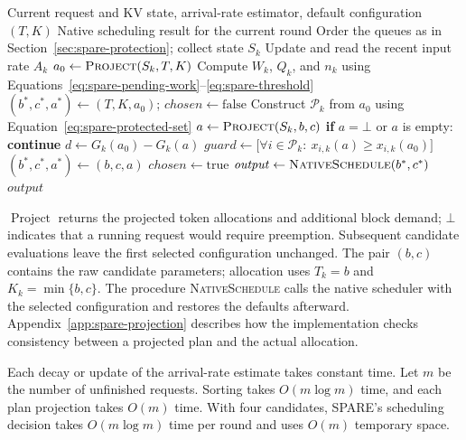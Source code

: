 \documentclass[sigconf,anonymous,review]{acmart}
\begin{document}
\begin{algorithm}[tbp]
\caption{SPARE Per-Iteration Scheduling}
\label{alg:spare-scheduling}
\begingroup
{}
\small
\begin{algorithmic}[1]
\Require Current request and KV state, arrival-rate estimator, default configuration $(T,K)$
\Ensure Native scheduling result for the current round
\State Order the queues as in Section~\ref{sec:spare-protection}; collect state $S_k$
\State Update and read the recent input rate $A_k$
\State $a_0\gets\Call{Project}{S_k,T,K}$
\State Compute $W_k$, $Q_k$, and $n_k$ using Equations~\eqref{eq:spare-pending-work}--\eqref{eq:spare-threshold}
\State $(b^*,c^*,a^*)\gets(T,K,a_0)$; $\mathit{chosen}\gets\mathrm{false}$
    \State Construct $\mathcal P_k$ from $a_0$ using Equation~\eqref{eq:spare-protected-set}
        \State $a\gets\Call{Project}{S_k,b,c}$
        \State \textbf{if} $a=\bot$ or $a$ is empty: \textbf{continue}
        \State $d\gets G_k(a_0)-G_k(a)$
        \State $\mathit{guard}\gets\bigl[\forall i\in\mathcal P_k:\ x_{i,k}(a)\ge x_{i,k}(a_0)\bigr]$
            \State $(b^*,c^*,a^*)\gets(b,c,a)$
            \State $\mathit{chosen}\gets\mathrm{true}$
        \EndIf
    \EndFor
\EndIf
\State $\mathit{output}\gets\Call{NativeSchedule}{b^*,c^*}$
\State \Return $\mathit{output}$
\end{algorithmic}
\endgroup
\end{algorithm}

$\operatorname{Project}$ returns the projected token allocations and additional block demand; $\bot$ indicates that a running request would require preemption. Subsequent candidate evaluations leave the first selected configuration unchanged. The pair $(b,c)$ contains the raw candidate parameters; allocation uses $T_k=b$ and $K_k=\min\{b,c\}$. The procedure \textsc{NativeSchedule} calls the native scheduler with the selected configuration and restores the defaults afterward. Appendix~\ref{app:spare-projection} describes how the implementation checks consistency between a projected plan and the actual allocation.

Each decay or update of the arrival-rate estimate takes constant time. Let $m$ be the number of unfinished requests. Sorting takes $O(m\log m)$ time, and each plan projection takes $O(m)$ time. With four candidates, SPARE's scheduling decision takes $O(m\log m)$ time per round and uses $O(m)$ temporary space.
\end{document}
